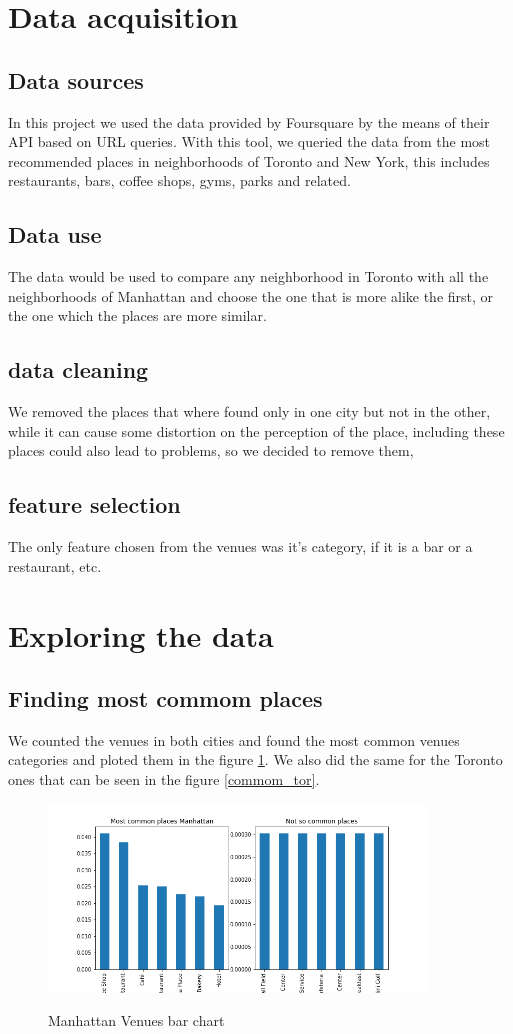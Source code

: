 \documentclass{article}
\begin{document}
\section{Data acquisition}
\subsection{Data sources}
In this project we used the data provided by Foursquare by the means of their API based on URL queries. With this tool, we queried the data from the most recommended places in neighborhoods of Toronto and New York, this includes restaurants, bars, coffee shops, gyms, parks and related.

\subsection{Data use}
The data would be used to compare any neighborhood in Toronto with all the neighborhoods of Manhattan and choose the one that is more alike the first, or the one which the places are more similar.

\subsection{data cleaning}
We removed the places that where found only in one city but not in the other, while it can cause some distortion on the perception of the place, including these places could also lead to problems, so we decided to remove them,

\subsection{feature selection}
The only feature chosen from the venues was it's category, if it is a bar or a restaurant, etc.

\section{Exploring the data}
\subsection{Finding most commom places}
We counted the venues in both cities and found the most common venues categories and ploted them in the figure \ref{commom_man}. We also did the same for the Toronto ones that can be seen in the figure \ref{commom_tor}.

\begin{figure}[h!]
\includegraphics[width=10cm]{Common_manhattan.png}
\label{commom_man}
\caption{Manhattan Venues bar chart}
\end{figure}
\end{document}
